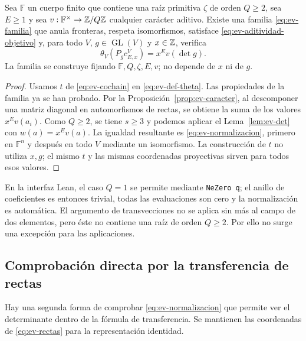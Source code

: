 \begin{teorema}
\label{thm:ev-theta}
Sea $\mathbb F$ un cuerpo finito que contiene una raíz primitiva $\zeta$ de orden $Q\ge2$, sea $E\ge1$ y sea $v:\mathbb F^\times\to\mathbb{Z}/Q\mathbb{Z}$ cualquier carácter aditivo. Existe una familia \eqref{eq:ev-familia} que anula fronteras, respeta isomorfismos, satisface \eqref{eq:ev-aditividad-objetivo} y, para todo $V$, $g\in\operatorname{GL}(V)$ y $x\in\mathbb{Z}$, verifica
\begin{equation}
 \boxed{\theta_V(P_g c_{E,x}^V)=x^E v(\det g).}
 \label{eq:ev-normalizacion}
\end{equation}
La familia se construye fijando $\mathbb F,Q,\zeta,E,v$; no depende de $x$ ni de $g$.
\end{teorema}
\begin{proof}
Usamos $t$ de \eqref{eq:ev-cochain} en \eqref{eq:ev-def-theta}. Las propiedades de la familia ya se han probado. Por la Proposición~\ref{prop:ev-caracter}, al descomponer una matriz diagonal en automorfismos de rectas, se obtiene la suma de los valores $x^Ev(a_i)$. Como $Q\ge2$, se tiene $s\ge3$ y podemos aplicar el Lema~\ref{lem:ev-det} con $w(a)=x^Ev(a)$. La igualdad resultante es \eqref{eq:ev-normalizacion}, primero en $\mathbb F^n$ y después en todo $V$ mediante un isomorfismo. La construcción de $t$ no utiliza $x,g$; el mismo $t$ y las mismas coordenadas proyectivas sirven para todos esos valores.
\end{proof}

En la interfaz Lean, el caso $Q=1$ se permite mediante \texttt{NeZero q}; el anillo de coeficientes es entonces trivial, todas las evaluaciones son cero y la normalización es automática. El argumento de transvecciones no se aplica sin más al campo de dos elementos, pero éste no contiene una raíz de orden $Q\ge2$. Por ello no surge una excepción para las aplicaciones.

\subsection{Comprobación directa por la transferencia de rectas}

Hay una segunda forma de comprobar \eqref{eq:ev-normalizacion} que permite ver el determinante dentro de la fórmula de transferencia. Se mantienen las coordenadas de \eqref{eq:ev-rectas} para la representación identidad.

